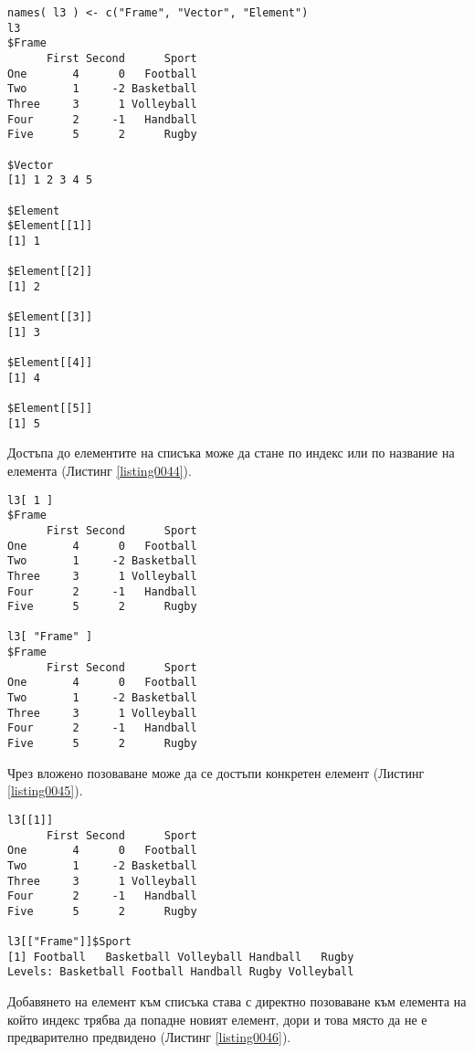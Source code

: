 \begin{lstlisting}[caption=Названия на елементите в списъка, label=listing0043]
names( l3 ) <- c("Frame", "Vector", "Element")
l3
$Frame
      First Second      Sport
One       4      0   Football
Two       1     -2 Basketball
Three     3      1 Volleyball
Four      2     -1   Handball
Five      5      2      Rugby

$Vector
[1] 1 2 3 4 5

$Element
$Element[[1]]
[1] 1

$Element[[2]]
[1] 2

$Element[[3]]
[1] 3

$Element[[4]]
[1] 4

$Element[[5]]
[1] 5
\end{lstlisting}

Достъпа до елементите на списъка може да стане по индекс или по название на елемента (Листинг \ref{listing0044}).

\begin{lstlisting}[caption=Достъп до елементите на списъка, label=listing0044]
l3[ 1 ]
$Frame
      First Second      Sport
One       4      0   Football
Two       1     -2 Basketball
Three     3      1 Volleyball
Four      2     -1   Handball
Five      5      2      Rugby

l3[ "Frame" ]
$Frame
      First Second      Sport
One       4      0   Football
Two       1     -2 Basketball
Three     3      1 Volleyball
Four      2     -1   Handball
Five      5      2      Rugby
\end{lstlisting}

Чрез вложено позоваване може да се достъпи конкретен елемент (Листинг \ref{listing0045}).

\begin{lstlisting}[caption=Вложено позоваване, label=listing0045]
l3[[1]]
      First Second      Sport
One       4      0   Football
Two       1     -2 Basketball
Three     3      1 Volleyball
Four      2     -1   Handball
Five      5      2      Rugby

l3[["Frame"]]$Sport
[1] Football   Basketball Volleyball Handball   Rugby     
Levels: Basketball Football Handball Rugby Volleyball
\end{lstlisting}

Добавянето на елемент към списъка става с директно позоваване към елемента на който индекс трябва да попадне новият елемент, дори и това място да не е предварително предвидено (Листинг \ref{listing0046}).

